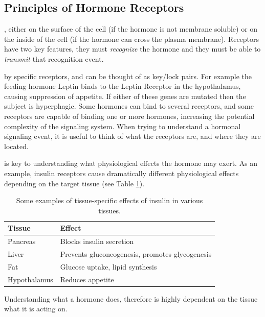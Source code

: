 \documentclass{tufte-handout}
\begin{document}
\subsection{Principles of Hormone Receptors}

, either on the surface of the cell (if the hormone is not membrane soluble) or on the inside of the cell (if the hormone can cross the plasma membrane).  Receptors have two key features, they must \emph{recognize} the hormone and they must be able to \emph{transmit} that recognition event.

 by specific receptors, and can be thought of as key/lock pairs.  For example the feeding hormone Leptin binds to the Leptin Receptor in the hypothalamus, causing suppression of appetite.  If either of these genes are mutated then the subject is hyperphagic.  Some hormones can bind to several receptors, and some receptors are capable of binding one or more hormones, increasing the potential complexity of the signaling system.  When trying to understand a hormonal signaling event, it is useful to think of what the receptors are, and where they are located.

 is key to understanding what physiological effects the hormone may exert.  As an example, insulin receptors cause dramatically different physiological effects depending on the target tissue (see Table \ref{tab:insulin-tissue-roles}).


\begin{table}
  \centering
  \begin{tabular}{ll}
    \toprule
    Tissue & Effect \\
    \midrule
    Pancreas & Blocks insulin secretion \\
    Liver & Prevents gluconeogenesis, promotes glycogenesis\\
    Fat & Glucose uptake, lipid synthesis \\
    Hypothalamus & Reduces appetite \\
    \bottomrule
  \end{tabular}
  \caption{Some examples of tissue-specific effects of insulin in various tissues.}
  \label{tab:insulin-tissue-roles}
\end{table}

Understanding what a hormone does, therefore is highly dependent on the tissue what it is acting on.
\end{document}

